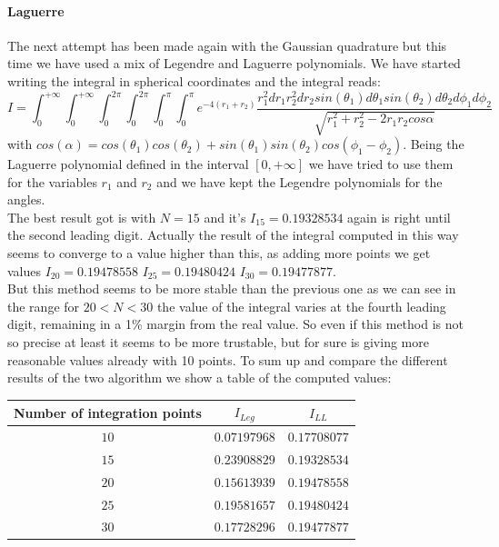 \documentclass[10pt,a4paper,titlepage]{article}
\begin{document}
\paragraph{Laguerre}The next attempt has been made again with the Gaussian quadrature but this time we have used a mix of Legendre and Laguerre polynomials. We have started writing the integral in spherical coordinates and the integral reads: \begin{equation} I=\int_{0}^{+\infty}\int_{0}^{+\infty}\int_{0}^{2 \pi}\int_{0}^{2 \pi}\int_{0}^{\pi}\int_{0}^{\pi} e^{-4(r_1+r_2)}\frac{r_1^2dr_1r_2^2dr_2sin(\theta_1)d\theta_1sin(\theta_2)d\theta_2d\phi_1d\phi_2}{\sqrt{r_1^2+r_2^2-2r_1r_2cos\alpha}}
\end{equation}
with $cos(\alpha)=cos(\theta_1)cos(\theta_2)+sin(\theta_1)sin(\theta_2)cos(\phi_1-\phi_2)$. Being the Laguerre polynomial defined in the interval $[0,+\infty]$ we have tried to use them for the variables $r_1$ and $r_2$ and we have kept the Legendre polynomials for the angles. 
\\
The best result got is with $N=15$ and it's $I_{15}=0.19328534$ again is right until the second leading digit. Actually the result of the integral computed in this way seems to converge to a value higher than this, as adding more points we get values $I_{20}=0.19478558$ $I_{25}=0.19480424$ $I_{30}=0.19477877$.
\\
But this method seems to be more stable than the previous one as we can see in the range for $20<N<30$ the value of the integral varies at the fourth leading digit, remaining in a 1\% margin from the real value. So even if this method is not so precise at least it seems to be more trustable, but for sure is giving more reasonable values already with 10 points. To sum up and compare the different results of the two algorithm we show a table of the computed values:
\begin{center}
\begin{tabular}{|c|c|c|}
\hline
Number of integration points          &  $I_{Leg}$    &  $I_{LL}$               \\\hline
$10$ &  $0.07197968$ & $0.17708077$ \\ \hline
$15$ & $0.23908829$ & $0.19328534$ \\\hline
$20$ & $0.15613939$ & $0.19478558$  \\\hline
$25$ & $0.19581657$ & $0.19480424$  \\\hline
$30$ & $0.17728296$ & $ 0.19477877$ \\\hline
\end{tabular}

\end{center}
\end{document}
